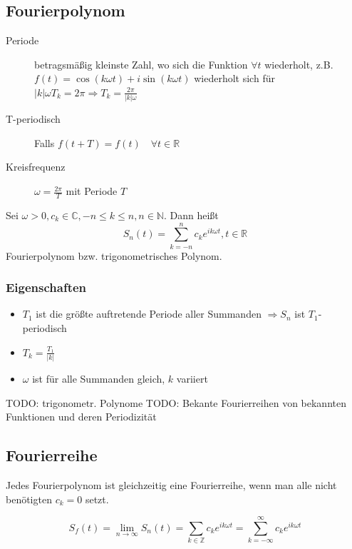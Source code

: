 \begin{sectionbox}
    \subsection{Fourierpolynom}
    \begin{description}
        \item[Periode] betragsmäßig kleinste Zahl, wo sich die Funktion $\forall t$ wiederholt,
              z.B. $f(t)=\cos(k\omega t) + i\sin(k\omega t)$ wiederholt sich für $|k|\omega T_k=2\pi \Rightarrow T_k=\frac{2\pi}{|k|\omega}$
        \item[T-periodisch] Falls $f(t + T)=f(t) \quad \forall t\in\mathbb R$
        \item[Kreisfrequenz] $\omega = \frac{2\pi}{T}$ mit Periode $T$
    \end{description}

    Sei $\omega > 0, c_k \in \mathbb C, -n \le k \le n, n \in \mathbb N$. Dann heißt
    \begin{equation*}
        S_n(t)=\sum_{k=-n}^{n}c_ke^{ik\omega t}, t\in\mathbb R
    \end{equation*}
    Fourierpolynom bzw. trigonometrisches Polynom.

    \subsubsection{Eigenschaften}
    \begin{itemize}
        \item $T_1$ ist die größte auftretende Periode aller Summanden $\Rightarrow S_n$ ist $T_1$-periodisch
        \item $T_k= \frac{T_1}{|k|}$
        \item $\omega$ ist für alle Summanden gleich, $k$ variiert
    \end{itemize}
    TODO: trigonometr. Polynome
    TODO: Bekante Fourierreihen von bekannten Funktionen und deren Periodizität
\end{sectionbox}

\subsection{Fourierreihe}
Jedes Fourierpolynom ist gleichzeitig eine Fourierreihe, wenn man alle nicht benötigten $c_k=0$ setzt.
\begin{emphbox}
    \begin{equation*}
        S_f(t)=\lim_{n\rightarrow\infty}S_n(t)=\sum_{k\in\mathbb Z}c_ke^{ik\omega t}=\sum_{k=-\infty}^{\infty}c_ke^{ik\omega t}
    \end{equation*}
\end{emphbox}

